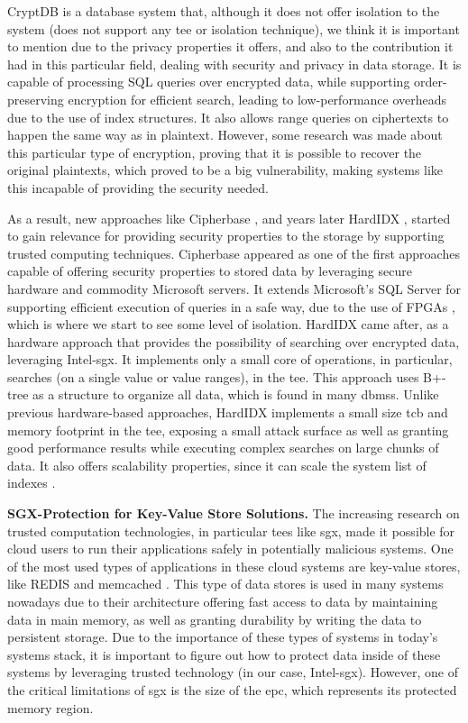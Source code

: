 CryptDB \cite{cryptDBPaper} is a database system that, although it does not offer isolation to the system (does not support any \gls{tee} or isolation technique), we think it is important to mention due to the privacy properties it offers, and also to the contribution it had in this particular field, dealing with security and privacy in data storage.
It is capable of processing SQL queries over encrypted data, while supporting order-preserving encryption for efficient search, leading to low-performance overheads due to the use of index structures. It also allows range queries on ciphertexts to happen the same way as in plaintext. However, some research  \cite{naveedPaper} was made about this particular type of encryption, proving that it is possible to recover the original plaintexts, which proved to be a big vulnerability, making systems like this incapable of providing the security needed.

As a result, new approaches like Cipherbase \cite{cipherbasePaper}, and years later HardIDX \cite{hardIDXPaper}, started to gain relevance for providing security properties to the storage by supporting trusted computing techniques.
Cipherbase appeared as one of the first approaches capable of offering security properties to stored data by leveraging secure hardware and commodity Microsoft servers. It extends Microsoft's SQL Server for supporting efficient execution of queries in a safe way, due to the use of FPGAs \cite{fpga}, which is where we start to see some level of isolation.
HardIDX came after, as a hardware approach that provides the possibility of searching over encrypted data, leveraging Intel-\gls{sgx}. It implements only a small core of operations, in particular, searches (on a single value or value ranges), in the \gls{tee}.
This approach uses B+-tree as a structure to organize all data, which is found in many \gls{dbms}s.
Unlike previous hardware-based approaches, HardIDX implements a small size \gls{tcb} and memory footprint in the \gls{tee}, exposing a small attack surface as well as granting good performance results while executing complex searches on large chunks of data. It also offers scalability properties, since it can scale the system list of indexes \cite{hardIDXPaper}.\newline

\textbf{SGX-Protection for Key-Value Store Solutions.}
The increasing research on trusted computation technologies, in particular \gls{tee}s like \gls{sgx}, made it possible for cloud users to run their applications safely in potentially malicious systems. One of the most used types of applications in these cloud systems are key-value stores, like REDIS \cite{redisWebsite} and memcached \cite{memcachedWebsite}. This type of data stores is used in many systems nowadays due to their architecture offering fast access to data by maintaining data in main memory, as well as granting durability by writing the data to persistent storage.  Due to the importance of these types of systems in today's systems stack, it is important to figure out how to protect data inside of these systems by leveraging trusted technology (in our case, Intel-\gls{sgx}). However, one of the critical limitations of \gls{sgx} is the size of the \gls{epc}, which represents its protected memory region. 

